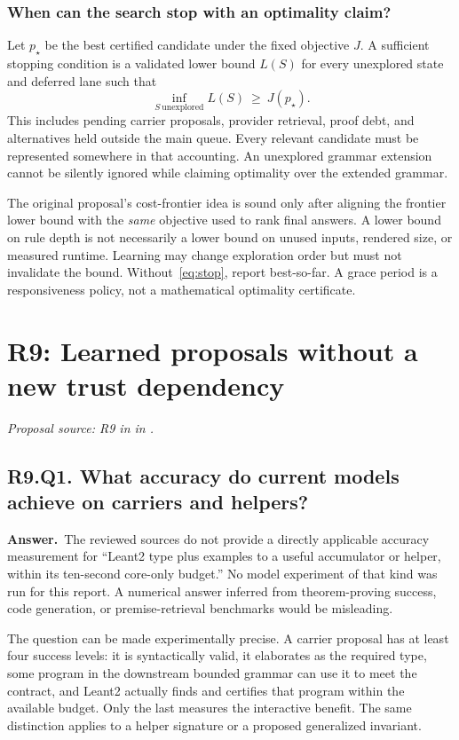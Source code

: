 \documentclass[11pt,a4paper]{article}
\theoremstyle{definition}
\theoremstyle{remark}
\newcommand{\answer}{\par\noindent\textbf{Answer.}\ }
\newcommand{\sourcepart}[1]{\par\noindent\textit{Proposal source: #1 in \cite{proposal}.}}
\newcommand{\qheading}[2]{\subsection{#1. #2}}
\begin{document}
\subsubsection*{When can the search stop with an optimality claim?}
Let $p_\star$ be the best certified candidate under the fixed objective $J$.
A sufficient stopping condition is a validated lower bound $L(S)$ for every
unexplored state and deferred lane such that
\[
 \inf_{S\ \mathrm{unexplored}} L(S)\ \ge\ J(p_\star).
 \tag{20}\label{eq:stop}
\]
This includes pending carrier proposals, provider retrieval, proof debt, and
alternatives held outside the main queue. Every relevant candidate must be
represented somewhere in that accounting. An unexplored grammar extension
cannot be silently ignored while claiming optimality over the extended grammar.

The original proposal's cost-frontier idea is sound only after aligning the
frontier lower bound with the \emph{same} objective used to rank final answers.
A lower bound on rule depth is not necessarily a lower bound on unused inputs,
rendered size, or measured runtime. Learning may change exploration order but
must not invalidate the bound. Without~\eqref{eq:stop}, report best-so-far.
A grace period is a responsiveness policy, not a mathematical optimality
certificate.

\section{R9: Learned proposals without a new trust dependency}
\label{sec:r9}
\sourcepart{R9 in }

\qheading{R9.Q1}{What accuracy do current models achieve on carriers and helpers?}
\answer The reviewed sources do not provide a directly applicable accuracy
measurement for ``Leant2 type plus examples to a useful accumulator or helper,
within its ten-second core-only budget.'' No model experiment of that kind was
run for this report. A numerical answer inferred from theorem-proving success,
code generation, or premise-retrieval benchmarks would be misleading.

The question can be made experimentally precise. A carrier proposal has at
least four success levels: it is syntactically valid, it elaborates as the
required type, some program in the downstream bounded grammar can use it to
meet the contract, and Leant2 actually finds and certifies that program within
the available budget. Only the last measures the interactive benefit. The same
distinction applies to a helper signature or a proposed generalized invariant.
\end{document}
